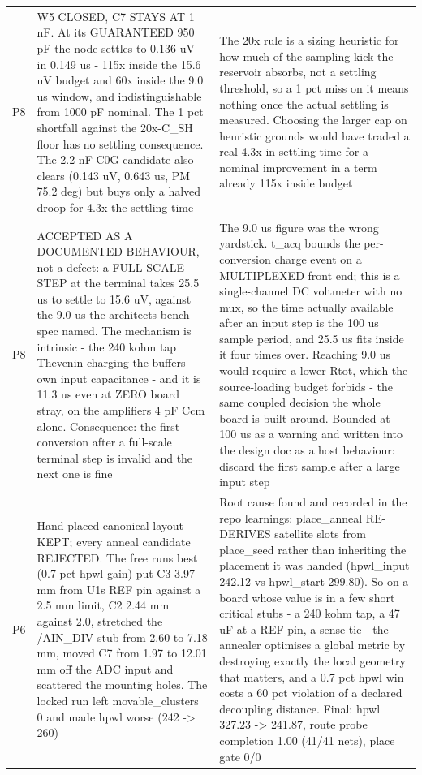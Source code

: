 \documentclass[11pt,a4paper]{article}
\begin{document}
{\begin{longtable}{lp{5.2cm}p{7.2cm}}
P8 & W5 CLOSED, C7 STAYS AT 1 nF. At its GUARANTEED 950 pF the node settles to 0.136 uV in 0.149 us - 115x inside the 15.6 uV budget and 60x inside the 9.0 us window, and indistinguishable from 1000 pF nominal. The 1 pct shortfall against the 20x-C\_SH floor has no settling consequence. The 2.2 nF C0G candidate also clears (0.143 uV, 0.643 us, PM 75.2 deg) but buys only a halved droop for 4.3x the settling time & The 20x rule is a sizing heuristic for how much of the sampling kick the reservoir absorbs, not a settling threshold, so a 1 pct miss on it means nothing once the actual settling is measured. Choosing the larger cap on heuristic grounds would have traded a real 4.3x in settling time for a nominal improvement in a term already 115x inside budget \\
P8 & ACCEPTED AS A DOCUMENTED BEHAVIOUR, not a defect: a FULL-SCALE STEP at the terminal takes 25.5 us to settle to 15.6 uV, against the 9.0 us the architects bench spec named. The mechanism is intrinsic - the 240 kohm tap Thevenin charging the buffers own input capacitance - and it is 11.3 us even at ZERO board stray, on the amplifiers 4 pF Ccm alone. Consequence: the first conversion after a full-scale terminal step is invalid and the next one is fine & The 9.0 us figure was the wrong yardstick. t\_acq bounds the per-conversion charge event on a MULTIPLEXED front end; this is a single-channel DC voltmeter with no mux, so the time actually available after an input step is the 100 us sample period, and 25.5 us fits inside it four times over. Reaching 9.0 us would require a lower Rtot, which the source-loading budget forbids - the same coupled decision the whole board is built around. Bounded at 100 us as a warning and written into the design doc as a host behaviour: discard the first sample after a large input step \\
P6 & Hand-placed canonical layout KEPT; every anneal candidate REJECTED. The free runs best (0.7 pct hpwl gain) put C3 3.97 mm from U1s REF pin against a 2.5 mm limit, C2 2.44 mm against 2.0, stretched the /AIN\_DIV stub from 2.60 to 7.18 mm, moved C7 from 1.97 to 12.01 mm off the ADC input and scattered the mounting holes. The locked run left movable\_clusters 0 and made hpwl worse (242 -\textgreater{} 260) & Root cause found and recorded in the repo learnings: place\_anneal RE-DERIVES satellite slots from place\_seed rather than inheriting the placement it was handed (hpwl\_input 242.12 vs hpwl\_start 299.80). So on a board whose value is in a few short critical stubs - a 240 kohm tap, a 47 uF at a REF pin, a sense tie - the annealer optimises a global metric by destroying exactly the local geometry that matters, and a 0.7 pct hpwl win costs a 60 pct violation of a declared decoupling distance. Final: hpwl 327.23 -\textgreater{} 241.87, route probe completion 1.00 (41/41 nets), place gate 0/0 \\

\end{longtable}}
\end{document}
